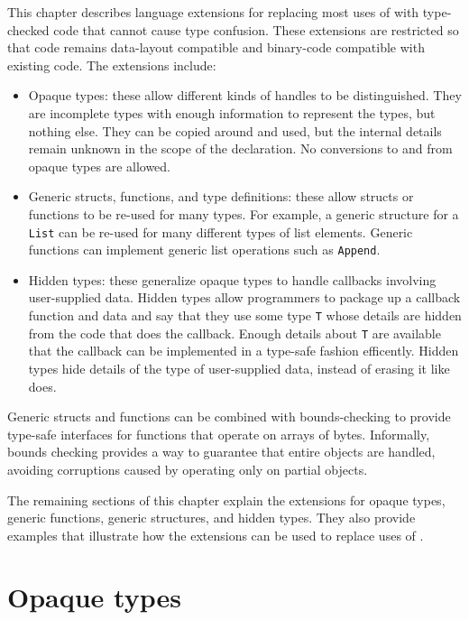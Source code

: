 This chapter describes language extensions for replacing most uses of \uncheckedptrvoid{}
with type-checked code that cannot cause type confusion.  These extensions
are restricted so that code remains data-layout compatible and binary-code
compatible with existing code.  The extensions include:
\begin{itemize}
\item Opaque types: these allow different kinds of handles to be distinguished.
They are incomplete types with enough information to represent
the types, but nothing else.  They can be copied around and used, but the internal
details remain unknown in the scope of the declaration.  No conversions to and 
from opaque types are allowed.

\item Generic structs, functions, and type definitions: these allow structs
or functions to be re-used for many types.   For example,
a generic structure for a  \lstinline+List+ can be re-used for many different types of list
elements.  Generic functions can implement generic list operations such as \lstinline+Append+.

\item Hidden types: these generalize opaque types to handle callbacks involving
user-supplied data.  Hidden types allow programmers to package up a callback function and data and
say that they use  some type \lstinline+T+ whose details are hidden from the code that does
the callback.   Enough details about \lstinline+T+ are available that the callback can be 
implemented in a type-safe fashion efficently.  Hidden types hide details of the type 
of user-supplied data, instead of erasing it like \uncheckedptrvoid{} does.
\end{itemize}

Generic structs and functions can be combined with bounds-checking 
to provide type-safe interfaces for functions that operate on arrays of bytes.
Informally, bounds checking provides a way to guarantee that entire objects are handled,
avoiding corruptions caused by operating only on partial objects.

The remaining sections of this chapter explain the extensions for 
opaque types, generic functions, generic structures, and hidden types.  They also
provide examples that illustrate how the extensions can be used to
replace uses of \uncheckedptrvoid{}.

\section{Opaque types}

